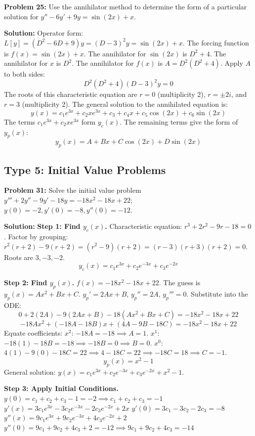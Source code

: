 \documentclass[11pt]{article}
\begin{document}
\vspace{0.5cm}
\textbf{Problem 25:} Use the annihilator method to determine the form of a particular solution for $y'' - 6y' + 9y = \sin(2x) + x$.

\textbf{Solution:}
Operator form: $L[y] = (D^2 - 6D + 9)y = (D - 3)^2 y = \sin(2x) + x$.
The forcing function is $f(x) = \sin(2x) + x$.
The annihilator for $\sin(2x)$ is $D^2 + 4$. The annihilator for $x$ is $D^2$.
The annihilator for $f(x)$ is $A = D^2(D^2 + 4)$.
Apply $A$ to both sides:
\[ D^2(D^2 + 4)(D - 3)^2 y = 0 \]
The roots of this characteristic equation are $r = 0$ (multiplicity 2), $r = \pm 2i$, and $r = 3$ (multiplicity 2).
The general solution to the annihilated equation is:
\[ y(x) = c_1 e^{3x} + c_2 x e^{3x} + c_3 + c_4 x + c_5 \cos(2x) + c_6 \sin(2x) \]
The terms $c_1 e^{3x} + c_2 x e^{3x}$ form $y_c(x)$. The remaining terms give the form of $y_p(x)$:
\[ y_p(x) = A + B x + C \cos(2x) + D \sin(2x) \]

\subsection{Type 5: Initial Value Problems}

\textbf{Problem 31:} Solve the initial value problem $y''' + 2y'' - 9y' - 18y = -18x^2 - 18x + 22$; $y(0) = -2, y'(0) = -8, y''(0) = -12$.

\textbf{Solution:}
\textbf{Step 1: Find $y_c(x)$.}
Characteristic equation: $r^3 + 2r^2 - 9r - 18 = 0$.
Factor by grouping: $r^2(r + 2) - 9(r + 2) = (r^2 - 9)(r + 2) = (r - 3)(r + 3)(r + 2) = 0$.
Roots are $3, -3, -2$.
\[ y_c(x) = c_1 e^{3x} + c_2 e^{-3x} + c_3 e^{-2x} \]

\textbf{Step 2: Find $y_p(x)$.}
$f(x) = -18x^2 - 18x + 22$. The guess is $y_p(x) = A x^2 + B x + C$.
$y_p' = 2Ax + B$, $y_p'' = 2A$, $y_p''' = 0$.
Substitute into the ODE:
\[ 0 + 2(2A) - 9(2Ax + B) - 18(A x^2 + B x + C) = -18x^2 - 18x + 22 \]
\[ -18A x^2 + (-18A - 18B)x + (4A - 9B - 18C) = -18x^2 - 18x + 22 \]
Equate coefficients:
$x^2$: $-18A = -18 \implies A = 1$.
$x^1$: $-18(1) - 18B = -18 \implies -18B = 0 \implies B = 0$.
$x^0$: $4(1) - 9(0) - 18C = 22 \implies 4 - 18C = 22 \implies -18C = 18 \implies C = -1$.
\[ y_p(x) = x^2 - 1 \]
General solution: $y(x) = c_1 e^{3x} + c_2 e^{-3x} + c_3 e^{-2x} + x^2 - 1$.

\textbf{Step 3: Apply Initial Conditions.}
$y(0) = c_1 + c_2 + c_3 - 1 = -2 \implies c_1 + c_2 + c_3 = -1$
$y'(x) = 3c_1 e^{3x} - 3c_2 e^{-3x} - 2c_3 e^{-2x} + 2x$
$y'(0) = 3c_1 - 3c_2 - 2c_3 = -8$
$y''(x) = 9c_1 e^{3x} + 9c_2 e^{-3x} + 4c_3 e^{-2x} + 2$
$y''(0) = 9c_1 + 9c_2 + 4c_3 + 2 = -12 \implies 9c_1 + 9c_2 + 4c_3 = -14$
\end{document}

